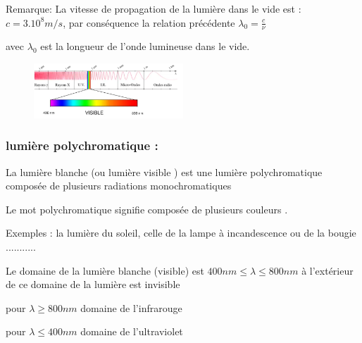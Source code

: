 \documentclass[12pt]{article}
\begin{document}
\begin{tcolorbox}
	Remarque: 
	La vitesse de propagation de la lumière dans le vide est : $c= 3.10^8m/s$, par conséquence la relation précédente $\lambda_0 = \frac{c}{\nu}$ 

	avec $\lambda_0$ est la longueur de l'onde lumineuse dans le vide.
\end{tcolorbox}
\begin{figure}
	\vspace{-1.5cm}
	\includegraphics[width=0.5\textwidth]{./img/OLpolyChromatique.png}
\end{figure}

\subsubsection{lumière polychromatique : }

La lumière blanche (ou lumière visible ) est une lumière polychromatique composée de plusieurs radiations monochromatiques

Le mot polychromatique signifie composée de plusieurs couleurs .

Exemples : la lumière du soleil, celle de la lampe à incandescence ou de la bougie ...........

Le domaine de la lumière blanche (visible) est $400nm \leq \lambda \leq 800nm$ à l'extérieur de ce domaine de la lumière est invisible 
 
pour $\lambda \geq 800nm$ domaine de l'infrarouge

pour $\lambda \leq 400nm$ domaine de l'ultraviolet









\end{document}
